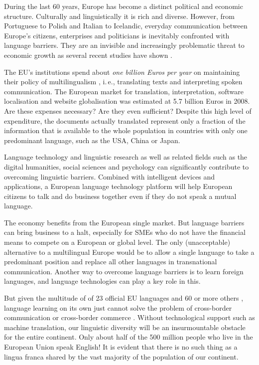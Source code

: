 \documentclass[10pt, plain]{../../metanetpaper}
\begin{document}
\begin{multicols}{2}
During the last 60 years, Europe has become a distinct political and economic structure. Culturally and linguistically it is rich and diverse. However, from Portuguese to Polish and Italian to Icelandic, everyday communication between Europe's citizens, enterprises and politicians is inevitably confronted with language barriers. They are an invisible and increasingly problematic threat to economic growth as several recent studies have shown \cite{economist12}.

The EU's institutions spend about \emph{one billion Euros per year} on maintaining their policy of multilingualism \cite{EC7}, i.\,e., translating texts and interpreting spoken communication. The European market for translation, interpretation, software localisation and website globalisation was estimated at 5.7 billion Euros in 2008. Are these expenses necessary? Are they even sufficient? Despite this high level of expenditure, the documents actually translated represent only a fraction of the information that is available to the whole population in countries with only one predominant language, such as the USA, China or Japan.

Language technology and linguistic research as well as related fields such as the digital humanities, social sciences and psychology can significantly contribute to overcoming linguistic barriers. Combined with intelligent devices and applications, a European language technology platform will help European citizens to talk and do business together even if they do not speak a mutual language.

The economy benefits from the European single market. But language barriers can bring business to a halt, especially for SMEs who do not have the financial means to compete on a European or global level. The only (unacceptable) alternative to a multilingual Europe \cite{lre2011} would be to allow a single language to take a predominant position and replace all other languages in transnational communication. Another way to overcome language barriers is to learn foreign languages, and language technologies can play a key role in this.

But given the multitude of of 23 official EU languages and 60 or more others \cite{eurobarometer2012}, language learning on its own just cannot solve the problem of cross-border communication or cross-border commerce \cite{economist12}. Without technological support such as machine translation, our linguistic diversity will be an insurmountable obstacle for the entire continent. Only about half of the 500 million people who live in the European Union speak English! It is evident that there is no such thing as a lingua franca shared by the vast majority of the population of our continent.


\end{multicols}
\end{document}
